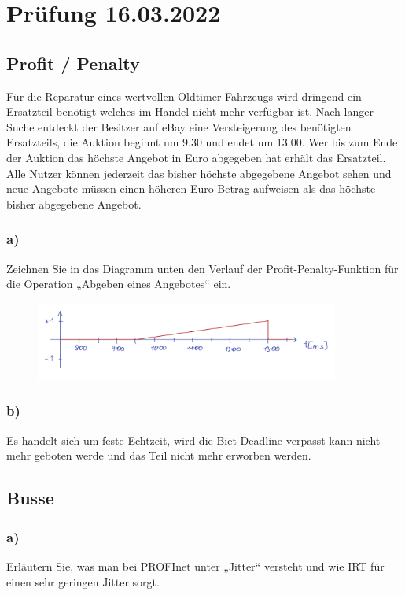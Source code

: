 \section{Prüfung 16.03.2022}
\subsection{Profit / Penalty}
Für die Reparatur eines wertvollen Oldtimer-Fahrzeugs wird dringend ein Ersatzteil benötigt welches im
Handel nicht mehr verfügbar ist. Nach langer Suche entdeckt der Besitzer auf eBay eine Versteigerung des
benötigten Ersatzteils, die Auktion beginnt um 9.30 und endet um 13.00. Wer bis zum Ende der Auktion das
höchste Angebot in Euro abgegeben hat erhält das Ersatzteil. Alle Nutzer können jederzeit das bisher
höchste abgegebene Angebot sehen und neue Angebote müssen einen höheren Euro-Betrag aufweisen als
das höchste bisher abgegebene Angebot.

\subsubsection{a)}
Zeichnen Sie in das Diagramm unten den Verlauf der Profit-Penalty-Funktion für die Operation
„Abgeben eines Angebotes“ ein.

\begin{figure}[H]
  \includegraphics[width=10cm]{images/KA160322/1a.PNG}
  \centering
\end{figure}

\subsubsection{b)}
Es handelt sich um feste Echtzeit, wird die Biet Deadline verpasst kann nicht mehr geboten werde und das
Teil nicht mehr erworben werden.

\subsection{Busse}
\subsubsection{a)}
Erläutern Sie, was man bei PROFInet unter „Jitter“ versteht und wie IRT für einen sehr geringen Jitter
sorgt.

